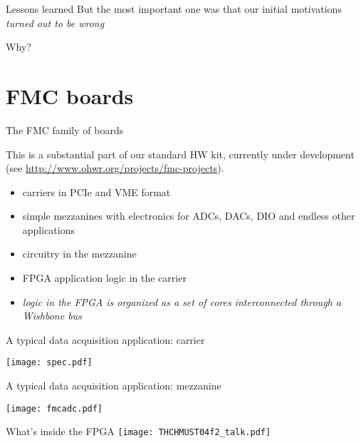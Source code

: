 \documentclass{beamer}
\begin{document}
\begin{frame}{Lessons learned}
But the most important one was that our initial motivations
\emph{turned out to be wrong}

\begin{center}
\Huge Why?
\end{center}
\end{frame}

\section{FMC boards}

\begin{frame}{The FMC family of boards}

This is a substantial part of our standard HW kit, currently under
development\\
(see \url{http://www.ohwr.org/projects/fmc-projects}).

\begin{itemize}
\item carriers in PCIe and VME format
\item simple mezzanines with electronics for ADCs, DACs, DIO and endless
    other applications
\item circuitry in the mezzanine
\item FPGA application logic in the carrier
\item \emph{logic in the FPGA is organized as a set of cores
    interconnected through a Wishbone bus}
\end{itemize}
\end{frame}

\begin{frame}{A typical data acquisition application: carrier}
\begin{center}
\texttt{[image: spec.pdf]}
\end{center}
\end{frame}

\begin{frame}{A typical data acquisition application: mezzanine}
\begin{center}
\texttt{[image: fmcadc.pdf]}
\end{center}
\end{frame}

\begin{frame}{What's inside the FPGA}
\texttt{[image: THCHMUST04f2\_talk.pdf]}
\end{frame}
\end{document}
